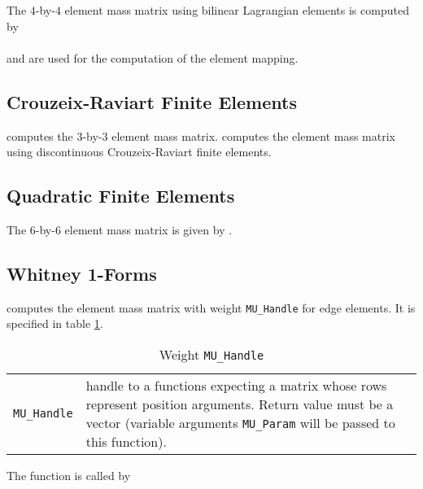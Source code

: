 The $4$-by-$4$ element mass matrix using bilinear Lagrangian elements is computed by \\

 \\

  and  are used for the computation of the element mapping.


\subsection{Crouzeix-Raviart Finite Elements} 

  computes the $3$-by-$3$ element mass matrix.  computes the element mass matrix using discontinuous Crouzeix-Raviart finite elements.


\subsection{Quadratic Finite Elements} 

 The $6$-by-$6$ element mass matrix is given by .


\subsection{Whitney 1-Forms} 

  computes the element mass matrix with weight {\tt MU\_Handle} for edge elements. It is specified in table \ref{tab:mu_handle}.

\begin{table}[htb]
  \begin{tabular}{p{2cm}p{9cm}}
    {\tt MU\_Handle} & {\small handle to a functions expecting a matrix whose rows represent position arguments. Return value must be a vector (variable arguments {\tt MU\_Param} will be passed to this function).} \\
  \end{tabular}
  \caption{Weight {\tt MU\_Handle}}
  \label{tab:mu_handle}
\end{table}

 The function is called by \\




